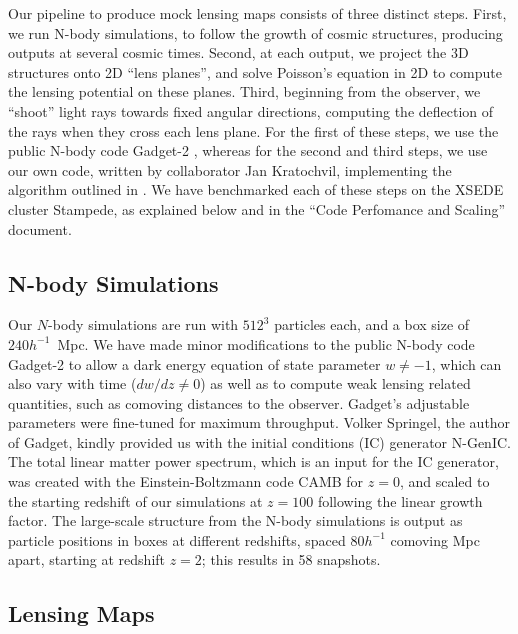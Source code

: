 \documentclass[10pt, preprint]{aastex}
\begin{document}
Our pipeline to produce mock lensing maps consists of three distinct
steps.  First, we run N-body simulations, to follow the growth of
cosmic structures, producing outputs at several cosmic times.  Second,
at each output, we project the 3D structures onto 2D ``lens planes'',
and solve Poisson's equation in 2D to compute the lensing potential on
these planes.  Third, beginning from the observer, we ``shoot'' light
rays towards fixed angular directions, computing the deflection of the
rays when they cross each lens plane.  For the first of these steps,
we use the public N-body code Gadget-2 \cite{VS05}, whereas for the
second and third steps, we use our own code, written by collaborator
Jan Kratochvil, implementing the algorithm outlined in \citet{H&M01}.
We have benchmarked each of these steps on the XSEDE cluster Stampede,
as explained below and in the ``Code Perfomance and Scaling''
document.

\subsection{N-body Simulations}

Our $N$-body simulations are run with $512^3$ particles each, and a
box size of $240h^{-1}$~Mpc. We have made minor modifications to the
public N-body code Gadget-2 to allow a dark energy equation of state
parameter $w\neq -1$, which can also vary with time ($dw/dz\neq0$) as
well as to compute weak lensing related quantities, such as comoving
distances to the observer.  Gadget's adjustable parameters were
fine-tuned for maximum throughput. Volker Springel, the author of
Gadget, kindly provided us with the initial conditions (IC) generator
N-GenIC. The total linear matter power spectrum, which is an input for
the IC generator, was created with the Einstein-Boltzmann code CAMB
\citep{CAMB} for $z=0$, and scaled to the starting redshift of our
simulations at $z=100$ following the linear growth factor.  The
large-scale structure from the N-body simulations is output as
particle positions in boxes at different redshifts, spaced $80h^{-1}$
comoving Mpc apart, starting at redshift $z=2$; this results in 58
snapshots.

\subsection{Lensing Maps}
\end{document}
